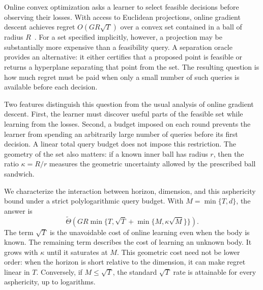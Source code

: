 \documentclass[11pt]{article}
\newcommand{\wtTheta}{\widetilde\Theta}
\theoremstyle{definition}
\begin{document}
Online convex optimization asks a learner to select feasible decisions before
observing their losses. With access to Euclidean projections, online gradient
descent achieves regret $O(GR\sqrt T)$ over a convex set contained in a ball of
radius $R$~\cite{zinkevich2003}. For a set specified implicitly, however, a
projection may be substantially more expensive than a feasibility query. A
separation oracle provides an alternative: it either certifies that a proposed
point is feasible or returns a hyperplane separating that point from the set.
The resulting question is how much regret must be paid when only a small
number of such queries is available before each decision.

Two features distinguish this question from the usual analysis of online
gradient descent. First, the learner must discover useful parts of the
feasible set while learning from the losses. Second, a budget imposed on each
round prevents the learner from spending an arbitrarily large number of
queries before its first decision. A linear total query budget does not impose
this restriction. The geometry of the set also matters: if a known inner ball
has radius $r$, then the ratio $\kappa=R/r$ measures the geometric uncertainty
allowed by the prescribed ball sandwich.

We characterize the interaction between horizon, dimension, and this
asphericity bound under a strict polylogarithmic query budget. With
$M=\min\{T,d\}$, the answer is
\begin{equation}\label{eq:headline}
 \wtTheta\!\left(GR\min\{T,\sqrt T+\min\{M,\kappa\sqrt M\}\}\right).
\end{equation}
The term $\sqrt T$ is the unavoidable cost of online learning even when the
body is known. The remaining term describes the cost of learning an unknown
body. It grows with $\kappa$ until it saturates at $M$. This geometric cost
need not be lower order: when the horizon is short relative to the dimension,
it can make regret linear in $T$. Conversely, if $M\le\sqrt T$, the standard
$\sqrt T$ rate is attainable for every asphericity, up to logarithms.
\end{document}
